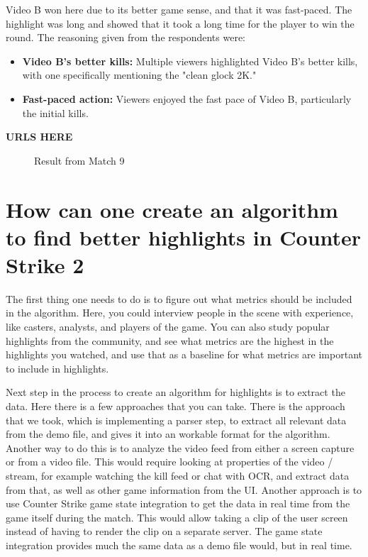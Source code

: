 Video B won here due to its better game sense, and that it was fast-paced. The highlight was long and showed that it took a long time for the player to win the round.
The reasoning given from the respondents were:

\begin{itemize}
\item \textbf{Video B's better kills:} Multiple viewers highlighted Video B's better kills, with one specifically mentioning the "clean glock 2K."
\item \textbf{Fast-paced action:} Viewers enjoyed the fast pace of Video B, particularly the initial kills.
\end{itemize}
\textbf{URLS HERE}
\begin{figure}
\centering
{}
\caption{Result from Match 9}
\label{fig:match9}
\end{figure}

\section{How can one create an algorithm to find better highlights in Counter Strike 2}
The first thing one needs to do is to figure out what metrics should be included in the algorithm. Here, you could interview people in the scene with experience, like casters, analysts, and players of the game. You can also study popular highlights from the community, and see what metrics are the highest in the highlights you watched, and use that as a baseline for what metrics are important to include in highlights. 

Next step in the process to create an algorithm for highlights is to extract the data. Here there is a few approaches that you can take. There is the approach that we took, which is implementing a parser step, to extract all relevant data from the demo file, and gives it into an workable format for the algorithm. Another way to do this is to analyze the video feed from either a screen capture or from a video file. This would require looking at properties of the video / stream, for example watching the kill feed or chat with OCR, and extract data from that, as well as other game information from the UI. Another approach is to use Counter Strike game state integration to get the data in real time from the game itself during the match. This would allow taking a clip of the user screen instead of having to render the clip on a separate server. The game state integration provides much the same data as a demo file would, but in real time.

